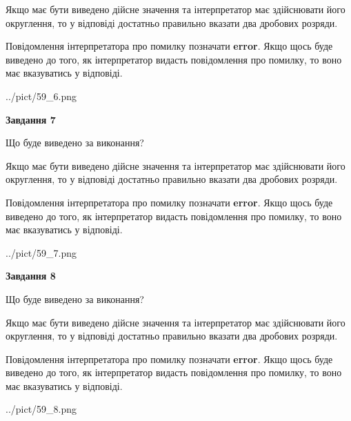 \documentclass[12pt, ukrainian]{article}
\begin{document}
{\begin {Large}
Якщо має бути виведено дійсне значення та інтерпретатор має здійснювати його округлення, 
то у відповіді достатньо правильно вказати два дробових розряди.

Повідомлення інтерпретатора про помилку позначати \textbf{error}.
Якщо щось буде виведено до того, як інтерпретатор видасть повідомлення про помилку, 
то воно має вказуватись у відповіді. \par

\begin{center}
	{../pict/59_6.png}
\end{center}
\newpage

{\begin {center}\textbf{Завдання 7}\end {center}}\par
Що буде виведено за виконання? \par

Якщо має бути виведено дійсне значення та інтерпретатор має здійснювати його округлення, 
то у відповіді достатньо правильно вказати два дробових розряди.

Повідомлення інтерпретатора про помилку позначати \textbf{error}.
Якщо щось буде виведено до того, як інтерпретатор видасть повідомлення про помилку, 
то воно має вказуватись у відповіді. \par

\begin{center}
	{../pict/59_7.png}
\end{center}
\newpage

{\begin {center}\textbf{Завдання 8}\end {center}}\par
Що буде виведено за виконання? \par

Якщо має бути виведено дійсне значення та інтерпретатор має здійснювати його округлення, 
то у відповіді достатньо правильно вказати два дробових розряди.

Повідомлення інтерпретатора про помилку позначати \textbf{error}.
Якщо щось буде виведено до того, як інтерпретатор видасть повідомлення про помилку, 
то воно має вказуватись у відповіді. \par

\begin{center}
	{../pict/59_8.png}
\end{center}
\newpage


\end{Large}}
\end{document}
